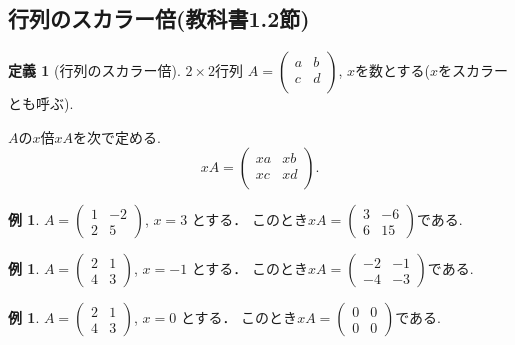 \documentclass[dvipdfmx,a4paper,11pt]{article}
\theoremstyle{definition}
\newtheorem{dfn}[thm]{定義}
\newtheorem{exa}[thm]{例}
\begin{document}
 \subsection{行列のスカラー倍(教科書1.2節)}
 
  \begin{tcolorbox}[
    colback = white,
    colframe = green!35!black,
    fonttitle = \bfseries,
    breakable = true]
    \begin{dfn}[行列のスカラー倍]
    \text{}
    
$2 \times 2$行列
$
A=\begin{pmatrix}
a& b \\
c& d \\
\end{pmatrix}
$, $x$を数とする($x$をスカラーとも呼ぶ).

$A$の$x$倍$xA$を次で定める.
$$
xA=
\begin{pmatrix}
xa&xb \\
xc&xd \\
\end{pmatrix}.
$$
  \end{dfn}
 \end{tcolorbox}

\begin{exa}
 $A = 
 \begin{pmatrix}
 1 &-2 \\
 2&5
 \end{pmatrix}
 $,
 $
 x =3
 $
 とする．
 このとき$
 xA =
 \begin{pmatrix}
 3 &-6 \\
 6&15
 \end{pmatrix}
 $である.
 \end{exa}
 \begin{exa}
 $A = 
 \begin{pmatrix}
 2&1 \\
 4&3
 \end{pmatrix}
 $, 
 $
 x =-1
 $
 とする．
 このとき$
 xA =
 \begin{pmatrix}
 -2 &-1 \\
-4&-3
 \end{pmatrix}
 $である.
 \end{exa}
  \begin{exa}
 $A = 
 \begin{pmatrix}
 2&1 \\
 4&3
 \end{pmatrix}
 $, 
 $
 x =0
 $
 とする．
 このとき$
 xA =
 \begin{pmatrix}
 0&0\\
0&0
 \end{pmatrix}
 $である.
 \end{exa}
 
\end{document}
